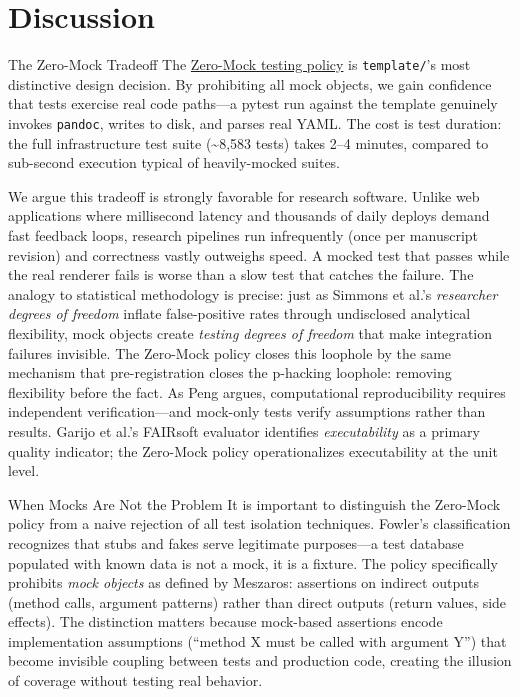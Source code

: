 \documentclass[
  ignorenonframetext,
]{beamer}
\author{\texorpdfstring{}{}}
\date{}
\begin{document}
\section{Discussion}\label{discussion}

\begin{frame}{The Zero-Mock Tradeoff}
\protect{}\label{the-zero-mock-tradeoff}
The \href{03e_quality.md\#zero-mock-testing-policy}{Zero-Mock testing
policy} is \texttt{template/}'s most distinctive design decision. By
prohibiting all mock objects, we gain confidence that tests exercise
real code paths---a pytest run against the template genuinely invokes
\texttt{pandoc}, writes to disk, and parses real YAML. The cost is test
duration: the full infrastructure test suite (\textasciitilde8,583
tests) takes 2--4 minutes, compared to sub-second execution typical of
heavily-mocked suites.

We argue this tradeoff is strongly favorable for research software.
Unlike web applications where millisecond latency and thousands of daily
deploys demand fast feedback loops, research pipelines run infrequently
(once per manuscript revision) and correctness vastly outweighs speed. A
mocked test that passes while the real renderer fails is worse than a
slow test that catches the failure. The analogy to statistical
methodology is precise: just as Simmons et al.'s \emph{researcher
degrees of freedom}  inflate
false-positive rates through undisclosed analytical flexibility, mock
objects create \emph{testing degrees of freedom} that make integration
failures invisible. The Zero-Mock policy closes this loophole by the
same mechanism that pre-registration 
closes the p-hacking loophole: removing flexibility before the fact. As
Peng  argues, computational reproducibility
requires independent verification---and mock-only tests verify
assumptions rather than results. Garijo et al.'s FAIRsoft evaluator
 identifies \emph{executability} as a primary
quality indicator; the Zero-Mock policy operationalizes executability at
the unit level.

\begin{block}{When Mocks Are Not the Problem}
\protect{}\label{when-mocks-are-not-the-problem}
It is important to distinguish the Zero-Mock policy from a naive
rejection of all test isolation techniques. Fowler's classification
 recognizes that stubs and fakes serve legitimate
purposes---a test database populated with known data is not a mock, it
is a fixture. The policy specifically prohibits \emph{mock objects} as
defined by Meszaros: assertions on indirect outputs (method calls,
argument patterns) rather than direct outputs (return values, side
effects). The distinction matters because mock-based assertions encode
implementation assumptions (``method X must be called with argument Y'')
that become invisible coupling between tests and production code,
creating the illusion of coverage without testing real behavior.
\end{block}


\end{frame}
\end{document}
